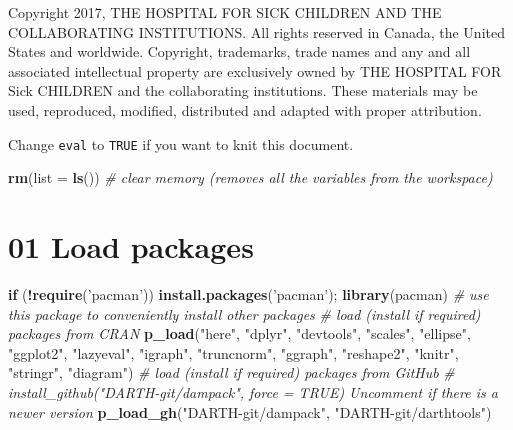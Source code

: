 \documentclass[
]{article}
\newenvironment{Shaded}{\begin{snugshade}}{\end{snugshade}}
\newcommand{\CommentTok}[1]{\textcolor[rgb]{0.56,0.35,0.01}{\textit{#1}}}
\newcommand{\ControlFlowTok}[1]{\textcolor[rgb]{0.13,0.29,0.53}{\textbf{#1}}}
\newcommand{\DataTypeTok}[1]{\textcolor[rgb]{0.13,0.29,0.53}{#1}}
\newcommand{\KeywordTok}[1]{\textcolor[rgb]{0.13,0.29,0.53}{\textbf{#1}}}
\newcommand{\NormalTok}[1]{#1}
\newcommand{\OperatorTok}[1]{\textcolor[rgb]{0.81,0.36,0.00}{\textbf{#1}}}
\newcommand{\StringTok}[1]{\textcolor[rgb]{0.31,0.60,0.02}{#1}}
\begin{document}
Copyright 2017, THE HOSPITAL FOR SICK CHILDREN AND THE COLLABORATING
INSTITUTIONS. All rights reserved in Canada, the United States and
worldwide. Copyright, trademarks, trade names and any and all associated
intellectual property are exclusively owned by THE HOSPITAL FOR Sick
CHILDREN and the collaborating institutions. These materials may be
used, reproduced, modified, distributed and adapted with proper
attribution.

\newpage

Change \texttt{eval} to \texttt{TRUE} if you want to knit this document.

\begin{Shaded}
\begin{Highlighting}[]
\KeywordTok{rm}\NormalTok{(}\DataTypeTok{list =} \KeywordTok{ls}\NormalTok{())      }\CommentTok{# clear memory (removes all the variables from the workspace)}
\end{Highlighting}
\end{Shaded}

\hypertarget{load-packages}{%
\section{01 Load packages}\label{load-packages}}

\begin{Shaded}
\begin{Highlighting}[]
\ControlFlowTok{if}\NormalTok{ (}\OperatorTok{!}\KeywordTok{require}\NormalTok{(}\StringTok{'pacman'}\NormalTok{)) }\KeywordTok{install.packages}\NormalTok{(}\StringTok{'pacman'}\NormalTok{); }\KeywordTok{library}\NormalTok{(pacman) }\CommentTok{# use this package to conveniently install other packages}
\CommentTok{# load (install if required) packages from CRAN}
\KeywordTok{p_load}\NormalTok{(}\StringTok{"here"}\NormalTok{, }\StringTok{"dplyr"}\NormalTok{, }\StringTok{"devtools"}\NormalTok{, }\StringTok{"scales"}\NormalTok{, }\StringTok{"ellipse"}\NormalTok{, }\StringTok{"ggplot2"}\NormalTok{, }\StringTok{"lazyeval"}\NormalTok{, }\StringTok{"igraph"}\NormalTok{, }\StringTok{"truncnorm"}\NormalTok{, }\StringTok{"ggraph"}\NormalTok{, }\StringTok{"reshape2"}\NormalTok{, }\StringTok{"knitr"}\NormalTok{, }\StringTok{"stringr"}\NormalTok{, }\StringTok{"diagram"}\NormalTok{)                                               }
\CommentTok{# load (install if required) packages from GitHub}
\CommentTok{# install_github("DARTH-git/dampack", force = TRUE) Uncomment if there is a newer version}
\KeywordTok{p_load_gh}\NormalTok{(}\StringTok{"DARTH-git/dampack"}\NormalTok{, }\StringTok{"DARTH-git/darthtools"}\NormalTok{)}
\end{Highlighting}
\end{Shaded}
\end{document}
